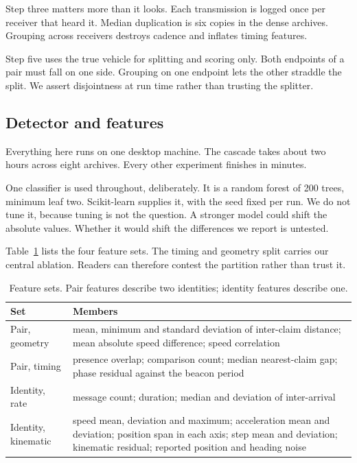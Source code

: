 \documentclass[conference]{IEEEtran}
\begin{document}
Step three matters more than it looks.
Each transmission is logged once per receiver that heard it.
Median duplication is six copies in the dense archives.
Grouping across receivers destroys cadence and inflates timing features.

Step five uses the true vehicle for splitting and scoring only.
Both endpoints of a pair must fall on one side.
Grouping on one endpoint lets the other straddle the split.
We assert disjointness at run time rather than trusting the splitter.

\subsection{Detector and features}

Everything here runs on one desktop machine.
The cascade takes about two hours across eight archives.
Every other experiment finishes in minutes.

One classifier is used throughout, deliberately.
It is a random forest of 200 trees, minimum leaf two.
Scikit-learn supplies it, with the seed fixed per run.
We do not tune it, because tuning is not the question.
A stronger model could shift the absolute values.
Whether it would shift the differences we report is untested.

Table~\ref{tab:features} lists the four feature sets.
The timing and geometry split carries our central ablation.
Readers can therefore contest the partition rather than trust it.

\begin{table}[t]
\caption{Feature sets. Pair features describe two identities;
identity features describe one.}
\label{tab:features}
\centering
\footnotesize
\begin{tabular}{@{}>{\raggedright\arraybackslash}p{1.35cm}>{\raggedright\arraybackslash}p{6.1cm}@{}}
\toprule
Set & Members \\
\midrule
Pair, geometry & mean, minimum and standard deviation of inter-claim distance;
mean absolute speed difference; speed correlation \\
Pair, timing & presence overlap; comparison count; median nearest-claim gap;
phase residual against the beacon period \\
Identity, rate & message count; duration; median and deviation of inter-arrival \\
Identity, kinematic & speed mean, deviation and maximum; acceleration mean and
deviation; position span in each axis; step mean and deviation; kinematic
residual; reported position and heading noise \\
\bottomrule
\end{tabular}
\end{table}
\end{document}
